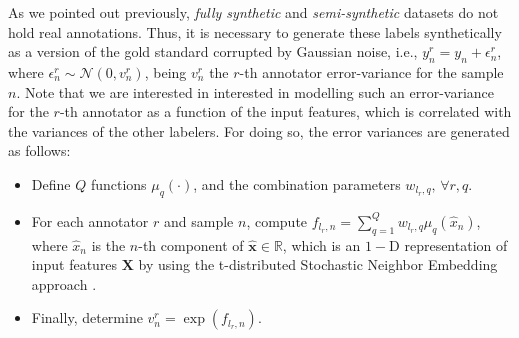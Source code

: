 \documentclass[journal]{IEEEtran}
\providecommand{\ve}[1]{{\bm{#1}}}%
\providecommand{\mat}[1]{{\bm{#1}}} %
\newcommand{\Real}{\mathbb{R}}
\providecommand{\ve}[1]{{\mathbf{#1}}}
\providecommand{\mat}[1]{{\mathbf{#1}}}
\newcommand{\gauss}{\mathcal{N}} %
\begin{document}
As we pointed out previously, \textit{fully synthetic} and \textit{semi-synthetic} datasets do not hold real annotations. Thus, it is necessary to generate these labels synthetically as a version of the gold standard corrupted by Gaussian noise, i.e., $y_n^r = y_n +\epsilon^r_{n}$, where $\epsilon^r_{n}\sim \gauss(0, v^r_{n})$, being $v^r_{n}$ the $r$-th annotator error-variance for the sample $n$. Note that we are interested in interested in modelling such an error-variance for the $r$-th annotator as a function of the input features, which is correlated with the variances of the other labelers. For doing so, the error variances are generated as follows:
\begin{itemize}
    \item Define $Q$ functions $\mu_q(\cdot)$, and the combination parameters $w_{l_r,q},\,\forall r, q$.
    \item For each annotator $r$ and sample $n$, compute $f_{l_r,n} = \sum_{q=1}^{Q}w_{l_r,q}\mu_q(\hat{x}_n)$, where $\hat{x}_n$ is the $n$-th component of $\hat{\ve{x}}\in \Real$, which is an $1-$D representation of input features $\mat{X}$ by using the t-distributed Stochastic Neighbor Embedding approach \cite{maaten2008visualizing}.
    \item Finally, determine $v^r_n = \exp(f_{l_r,n})$. 
\end{itemize}
\end{document}

